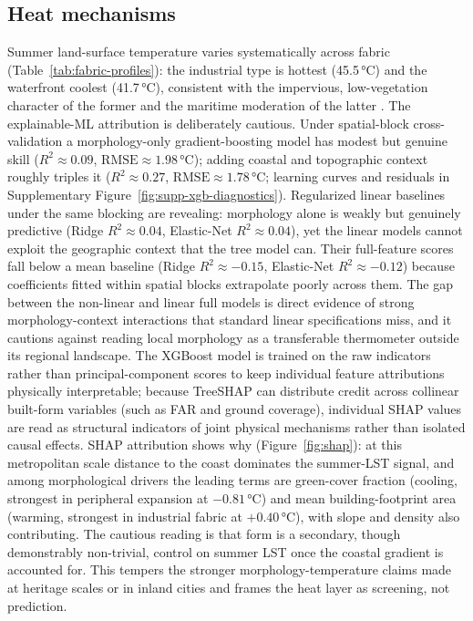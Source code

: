 \subsection{Heat mechanisms}
\label{sec:res-heat}
Summer land-surface temperature varies systematically across fabric
(Table~\ref{tab:fabric-profiles}): the industrial type is hottest (45.5\,\si{\celsius})
and the waterfront coolest (41.7\,\si{\celsius}), consistent with the impervious,
low-vegetation character of the former and the maritime moderation of the latter
\citep{guo2020ImpactUrban, jeon2023ImpactsUrban}. The explainable-ML attribution is
deliberately cautious. Under spatial-block cross-validation a morphology-only
gradient-boosting model has modest but genuine skill ($R^2 \approx 0.09$,
$\text{RMSE} \approx 1.98\,\si{\celsius}$); adding coastal and topographic context
roughly triples it ($R^2 \approx 0.27$, $\text{RMSE} \approx 1.78\,\si{\celsius}$;
learning curves and residuals in Supplementary Figure~\ref{fig:supp-xgb-diagnostics}).
Regularized linear baselines under the same blocking are revealing: morphology alone is
weakly but genuinely predictive (Ridge $R^2 \approx 0.04$, Elastic-Net $R^2 \approx 0.04$),
yet the linear models cannot exploit the geographic context that the tree model
can. Their full-feature scores fall below a mean baseline (Ridge $R^2 \approx -0.15$,
Elastic-Net $R^2 \approx -0.12$) because coefficients fitted within spatial blocks
extrapolate poorly across them. The gap between the non-linear and linear full models is
direct evidence of strong morphology-context interactions that standard linear
specifications miss, and it cautions against reading local morphology as a transferable
thermometer outside its regional landscape. The XGBoost model is trained on the raw
indicators rather than principal-component scores to keep individual feature attributions
physically interpretable; because TreeSHAP can distribute credit across collinear
built-form variables (such as FAR and ground coverage), individual SHAP values are read as
structural indicators of joint physical mechanisms rather than isolated causal effects.
SHAP attribution shows why (Figure~\ref{fig:shap}): at this metropolitan scale
distance to the coast dominates the summer-LST signal, and among morphological
drivers the leading terms are green-cover fraction (cooling, strongest in peripheral
expansion at $-0.81$\,\si{\celsius}) and mean building-footprint area (warming, strongest
in industrial fabric at $+0.40$\,\si{\celsius}), with slope and density also contributing.
The cautious reading is that form is a secondary, though demonstrably non-trivial, control
on summer LST once the coastal gradient is accounted for. This tempers the stronger
morphology-temperature claims made at heritage scales or in inland cities
\citep{wangZ2025MarginalInteraction, liu2026Nonlinear, li2026BlockGrid} and frames the
heat layer as screening, not prediction.

